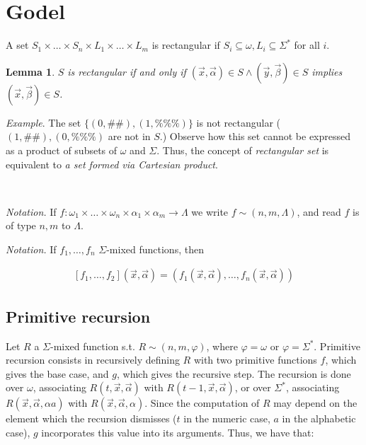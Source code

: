 \documentclass[a4paper, 12pt]{article}
\newtheorem{lemma}{Lemma}
\newtheorem{lemma}{Lemma}
\begin{document}
\pagebreak
\section{Godel}

\begin{definition}
    A set $S_1\times  \ldots  \times  S_n \times L_1 \times  \ldots \times  L_m$ is
    rectangular if $S_i \subseteq \omega, L_i \subseteq \Sigma^{*}$ for all $i$.
\end{definition}

\begin{lemma}
    $S$ is rectangular if and only if $(\overrightarrow{x},
    \overrightarrow{\alpha}) \in S \land (\overrightarrow{y},
    \overrightarrow{\beta}) \in S$ implies $(\overrightarrow{x},
    \overrightarrow{\beta}) \in S$.
\end{lemma}

\textit{Example}. The set $\{(0, \#\#), (1, \%\%\%)\}$ is not rectangular ($(1,
\#\#), (0, \%\%\%)$ are not in $S$.) Observe how this set cannot be expressed as
a product of subsets of $\omega$ and $\Sigma$. Thus, the concept of
\textit{rectangular set} is equivalent to \textit{a set formed via Cartesian
product}.

~

\textit{Notation.} If $f : \omega_1 \times \ldots \times \omega_n \times
\alpha_1 \times \alpha_m \to \Lambda$ we write $f \sim (n, m, \Lambda)$, and
read $f$ is of type $n, m$ to $\Lambda$.

\textit{Notation.} If $f_1, \ldots, f_n$ $\Sigma$-mixed functions, then 

\begin{align*}
    \left[ f_1, \ldots, f_2 \right](\overrightarrow{x}, \overrightarrow{\alpha})
    = \left( f_1(\overrightarrow{x}, \overrightarrow{\alpha}), \ldots,
    f_n(\overrightarrow{x}, \overrightarrow{\alpha}) \right) 
\end{align*}


\subsection{Primitive recursion} 

Let $R$ a $\Sigma$-mixed function s.t. $R \sim (n, m, \varphi)$, where $\varphi
= \omega$ or $\varphi = \Sigma^{*}$. Primitive recursion consists in recursively
defining $R$ with two primitive functions $f$, which gives the base case, and
$g$, which gives the recursive step. The recursion is done over $\omega$,
associating $R(t, \vec{x}, \vec{\alpha})$ with $R(t - 1, \vec{x},
\vec{\alpha})$, or over $\Sigma^{*}$, associating $R(\vec{x}, \vec{\alpha},
\alpha a)$ with $R(\vec{x}, \vec{\alpha}, \alpha)$. Since the computation of $R$
may depend on the element which the
recursion dismisses ($t$ in the numeric case, $a$ in the alphabetic case), $g$
incorporates this value into its arguments. Thus, we have that: 
\end{document}
